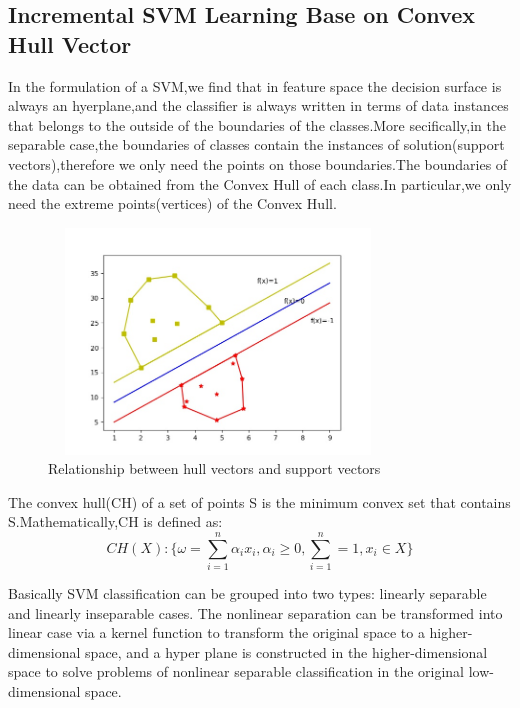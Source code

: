 \documentclass[a4paper]{article}
\begin{document}
\subsection{Incremental SVM Learning Base on Convex Hull Vector}
In the formulation of a SVM,we find that in feature space the decision surface is always an hyerplane,and the classifier is always written in terms of data instances that belongs to the outside of the boundaries of the classes.More secifically,in the separable case,the boundaries of classes contain the instances of solution(support vectors),therefore we only need the points on those boundaries.The boundaries of the data can be obtained from the Convex Hull of each class.In particular,we only need the extreme points(vertices) of the Convex Hull.





\begin{figure}[h]
  \centering
  \includegraphics[width=9cm,height=6cm]{HullVector_SupportVector}
  \caption{Relationship between hull vectors and support vectors}
\end{figure}

The convex hull(CH) of a set of points S is the minimum convex set that contains S.Mathematically,CH is defined as:
$$
CH(X) :\{ \omega = \sum_{i=1} ^{n} \alpha_i x_i, \alpha_i \geq 0, \sum_{i=1} ^{n} = 1, x_i \in X \}
$$

Basically SVM classification can be grouped into two types: linearly separable and linearly inseparable cases. The nonlinear separation can be transformed into linear case via a kernel function to transform the original space to a higher-dimensional space, and a hyper plane is constructed in the higher-dimensional space to solve problems of nonlinear separable classification in the original low-dimensional space.
 
\end{document}
